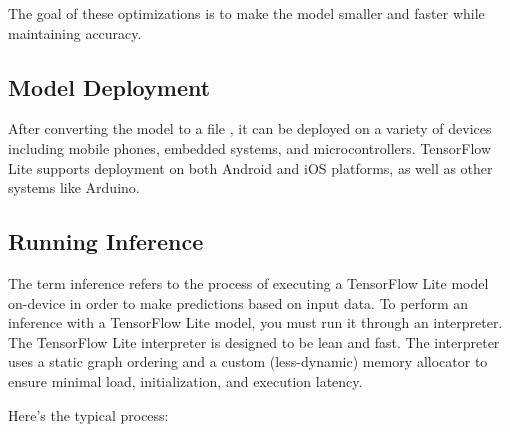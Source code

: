 The goal of these optimizations is to make the model smaller and faster while maintaining accuracy.

\subsection{Model Deployment}
After converting the model to a file , it can be deployed on a variety of devices including mobile phones, embedded systems, and microcontrollers. TensorFlow Lite supports deployment on both Android and iOS platforms, as well as other systems like Arduino.

\subsection{Running Inference}
The term inference refers to the process of executing a TensorFlow Lite model on-device in order to make predictions based on input data. To perform an inference with a TensorFlow Lite model, you must run it through an interpreter. The TensorFlow Lite interpreter is designed to be lean and fast. The interpreter uses a static graph ordering and a custom (less-dynamic) memory allocator to ensure minimal load, initialization, and execution latency. \cite{tensorflowLiteInference:2024} \cite{GoogleAIEdge:2024}

Here’s the typical process:


